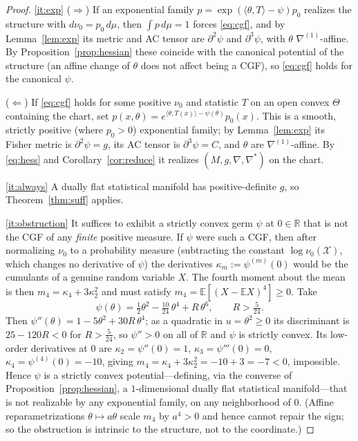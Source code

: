 \documentclass{amsart}
\theoremstyle{definition}
\theoremstyle{remark}
\begin{document}
\begin{proof}
\eqref{it:exp} ($\Rightarrow$) If an exponential family
$p=\exp(\langle\theta,T\rangle-\psi)p_{0}$ realizes the structure with
$d\nu_{0}=p_{0}\,d\mu$, then $\int p\,d\mu=1$ forces \eqref{eq:cgf}, and by
Lemma~\ref{lem:exp} its metric and AC tensor are $\partial^{2}\psi$ and
$\partial^{3}\psi$, with $\theta$ $\nabla^{(1)}$-affine. By
Proposition~\ref{prop:hessian} these coincide with the canonical potential of
the structure (an affine change of $\theta$ does not affect being a CGF), so
\eqref{eq:cgf} holds for the canonical $\psi$.

($\Leftarrow$) If \eqref{eq:cgf} holds for some positive $\nu_{0}$ and statistic
$T$ on an open convex $\Theta$ containing the chart, set
$p(x,\theta)=e^{\langle\theta,T(x)\rangle-\psi(\theta)}p_{0}(x)$. This is a
smooth, strictly positive (where $p_{0}>0$) exponential family; by
Lemma~\ref{lem:exp} its Fisher metric is $\partial^{2}\psi=g$, its AC tensor is
$\partial^{3}\psi=C$, and $\theta$ are $\nabla^{(1)}$-affine. By \eqref{eq:hess}
and Corollary~\ref{cor:reduce} it realizes $(M,g,\nabla,\nabla^{*})$ on the chart.

\eqref{it:always} A dually flat statistical manifold has positive-definite $g$,
so Theorem~\ref{thm:suff} applies.

\eqref{it:obstruction} It suffices to exhibit a strictly convex germ
$\psi$ at $0\in\mathbb R$ that is not the CGF of any \emph{finite} positive
measure. If $\psi$ were such a CGF, then after normalizing $\nu_{0}$ to a
probability measure (subtracting the constant $\log\nu_{0}(\mathcal X)$, which
changes no derivative of $\psi$) the derivatives $\kappa_{m}:=\psi^{(m)}(0)$
would be the cumulants of a genuine random variable $X$. The fourth moment about
the mean is then $m_{4}=\kappa_{4}+3\kappa_{2}^{2}$ and must satisfy
$m_{4}=\mathbb E[(X-\mathbb E X)^{4}]\ge0$. Take
\[
  \psi(\theta)=\tfrac12\theta^{2}-\tfrac{10}{24}\,\theta^{4}+R\,\theta^{6},
  \qquad R>\tfrac{5}{24}.
\]
Then $\psi''(\theta)=1-5\theta^{2}+30R\,\theta^{4}$; as a quadratic in
$u=\theta^{2}\ge0$ its discriminant is $25-120R<0$ for $R>\tfrac{5}{24}$, so
$\psi''>0$ on all of $\mathbb R$ and $\psi$ is strictly convex. Its low-order
derivatives at $0$ are $\kappa_{2}=\psi''(0)=1$, $\kappa_{3}=\psi'''(0)=0$,
$\kappa_{4}=\psi^{(4)}(0)=-10$, giving
$m_{4}=\kappa_{4}+3\kappa_{2}^{2}=-10+3=-7<0$, impossible. Hence $\psi$ is a
strictly convex potential---defining, via the converse of
Proposition~\ref{prop:hessian}, a $1$-dimensional dually flat statistical
manifold---that is not realizable by any exponential family, on any neighborhood
of $0$. (Affine reparametrizations $\theta\mapsto a\theta$ scale $m_{4}$ by
$a^{4}>0$ and hence cannot repair the sign; so the obstruction is intrinsic to the
structure, not to the coordinate.)
\end{proof}
\end{document}
